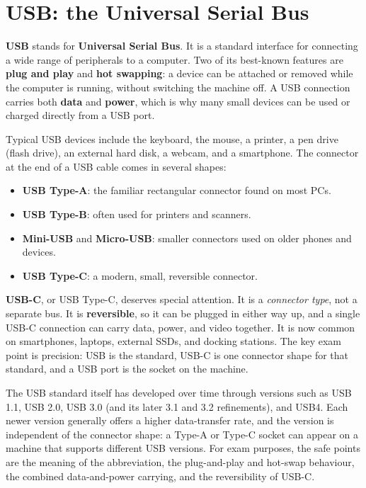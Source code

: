 \section{USB: the Universal Serial Bus}
\textbf{USB} stands for \textbf{Universal Serial Bus}. It is a standard
interface for connecting a wide range of peripherals to a computer. Two of
its best-known features are \textbf{plug and play} and \textbf{hot swapping}:
a device can be attached or removed while the computer is running, without
switching the machine off. A USB connection carries both \textbf{data} and
\textbf{power}, which is why many small devices can be used or charged
directly from a USB port.

Typical USB devices include the keyboard, the mouse, a printer, a pen drive
(flash drive), an external hard disk, a webcam, and a smartphone. The
connector at the end of a USB cable comes in several shapes:

\begin{itemize}
  \item \textbf{USB Type-A}: the familiar rectangular connector found on most
    PCs.
  \item \textbf{USB Type-B}: often used for printers and scanners.
  \item \textbf{Mini-USB} and \textbf{Micro-USB}: smaller connectors used on
    older phones and devices.
  \item \textbf{USB Type-C}: a modern, small, reversible connector.
\end{itemize}

\textbf{USB-C}, or USB Type-C, deserves special attention. It is a
\emph{connector type}, not a separate bus. It is \textbf{reversible}, so it
can be plugged in either way up, and a single USB-C connection can carry
data, power, and video together. It is now common on smartphones, laptops,
external SSDs, and docking stations. The key exam point is precision: USB is
the standard, USB-C is one connector shape for that standard, and a USB port
is the socket on the machine.

The USB standard itself has developed over time through versions such as USB
1.1, USB 2.0, USB 3.0 (and its later 3.1 and 3.2 refinements), and USB4. Each
newer version generally offers a higher data-transfer rate, and the version
is independent of the connector shape: a Type-A or Type-C socket can appear
on a machine that supports different USB versions. For exam purposes, the
safe points are the meaning of the abbreviation, the plug-and-play and
hot-swap behaviour, the combined data-and-power carrying, and the
reversibility of USB-C.

